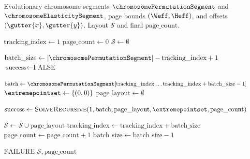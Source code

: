 \begin{algorithm}[h]
\caption{Sequence-Preserving Prefix Packing Decoder}
\label{alg:packing_decoder}
\begin{algorithmic}[1]
\REQUIRE Evolutionary chromosome segments $\chromosomePermutationSegment$ and $\chromosomeElasticitySegment$, page bounds $(\Weff, \Heff)$, and offsets $(\gutter{x}, \gutter{y})$.
\ENSURE Layout $\mathcal{S}$ and final $\text{page\_count}$.

\STATE $\text{tracking\_index} \leftarrow 1$
\STATE $\text{page\_count} \leftarrow 0$
\STATE $\mathcal{S} \leftarrow \emptyset$

    \STATE $\text{batch\_size} \leftarrow |\chromosomePermutationSegment| - \text{tracking\_index} + 1$
    \STATE $\text{success} \leftarrow \text{FALSE}$

        \STATE $\text{batch} \leftarrow \chromosomePermutationSegment[\text{tracking\_index} \dots \text{tracking\_index} + \text{batch\_size} - 1]$
        \STATE $\extremepointset \leftarrow \{(0,0)\}$ 
        \STATE $\text{page\_layout} \leftarrow \emptyset$

        \STATE $\text{success} \leftarrow \textsc{SolveRecursive}(1, \text{batch}, \text{page\_layout}, \extremepointset, \text{page\_count})$

            \STATE $\mathcal{S} \leftarrow \mathcal{S} \cup \text{page\_layout}$
            \STATE $\text{tracking\_index} \leftarrow \text{tracking\_index} + \text{batch\_size}$
            \STATE $\text{page\_count} \leftarrow \text{page\_count} + 1$
        \ELSE
            \STATE $\text{batch\_size} \leftarrow \text{batch\_size} - 1$
        \ENDIF
    \ENDWHILE

        \STATE \RETURN $\text{FAILURE}$ 
    \ENDIF
\ENDWHILE
\RETURN $\mathcal{S}, \text{page\_count}$
\end{algorithmic}
\end{algorithm}

